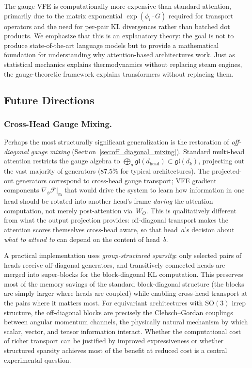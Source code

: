 \documentclass[twoside,11pt]{article}
\begin{document}
The gauge VFE is computationally more expensive than standard attention, primarily due to the matrix exponential $\exp(\phi_i \cdot G)$ required for transport operators and the need for per-pair KL divergences rather than batched dot products. We emphasize that this is an explanatory theory: the goal is not to produce state-of-the-art language models but to provide a mathematical foundation for understanding why attention-based architectures work. Just as statistical mechanics explains thermodynamics without replacing steam engines, the gauge-theoretic framework explains transformers without replacing them.

\subsection{Future Directions}

\subsubsection{Cross-Head Gauge Mixing.}

Perhaps the most structurally significant generalization is the restoration of \emph{off-diagonal gauge mixing} (Section~\ref{sec:off_diagonal_mixing}). Standard multi-head attention restricts the gauge algebra to $\bigoplus_a \mathfrak{gl}(d_{\mathrm{head}}) \subset \mathfrak{gl}(d_k)$, projecting out the vast majority of generators (87.5\% for typical architectures). The projected-out generators correspond to cross-head gauge transport; VFE gradient components $\nabla_\phi \mathcal{F}\big|_{\mathfrak{m}}$ that would drive the system to learn how information in one head should be rotated into another head's frame \emph{during} the attention computation, not merely post-attention via~$W_O$. This is qualitatively different from what the output projection provides: off-diagonal transport makes the attention scores themselves cross-head aware, so that head~$a$'s decision about \emph{what to attend to} can depend on the content of head~$b$.

A practical implementation uses \emph{group-structured sparsity}: only selected pairs of heads receive off-diagonal generators, and transitively connected heads are merged into super-blocks for the block-diagonal KL computation. This preserves most of the memory savings of the standard block-diagonal structure (the blocks are simply larger where heads are coupled) while enabling cross-head transport at the pairs where it matters most. For equivariant architectures with $\mathrm{SO}(3)$ irrep structure, the off-diagonal blocks are precisely the Clebsch--Gordan couplings between angular momentum channels, the physically natural mechanism by which scalar, vector, and tensor information interact. Whether the computational cost of richer transport can be justified by improved expressiveness or whether structured sparsity achieves most of the benefit at reduced cost is a central experimental question.
\end{document}
